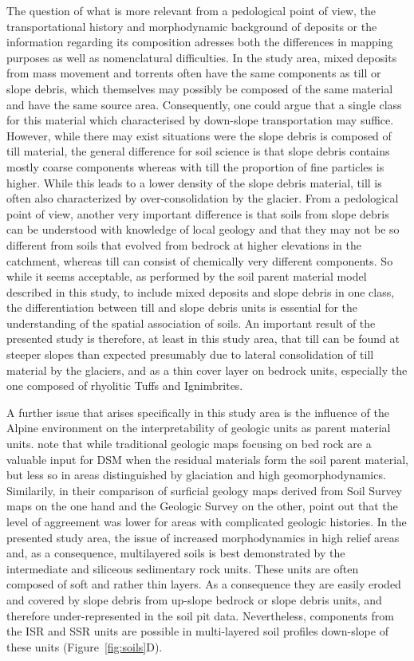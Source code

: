 \documentclass[preprint,12pt,authoryear]{elsarticle}
\begin{document}
The question of what is more relevant from a pedological point of view,  the transportational history and morphodynamic background of deposits  or the information regarding its composition adresses both the differences in mapping purposes as well as nomenclatural difficulties. In the study area, mixed deposits from mass movement and torrents often have the same components as till or slope debris, which themselves may possibly be composed of the same material and have the same source area. Consequently, one could argue that a single class for this material which characterised by down-slope transportation may suffice. However, while there may exist situations were the slope debris is composed of till material, the general difference for soil science is that slope debris contains mostly coarse components whereas with till the proportion of fine particles is higher. While this leads to a lower density of the slope debris material, till is often also characterized by over-consolidation by the glacier. From a pedological point of view, another very important difference is that soils from slope debris can be understood with knowledge of local geology and that they may not be so different from soils  that evolved from bedrock at higher elevations  in the catchment, whereas till can consist of chemically very different components. So while it seems acceptable, as performed by the soil parent material model described in this study, to include mixed deposits and slope debris in one class, the differentiation between till and slope debris units is essential for the understanding of the spatial association of soils. An important result of the presented study is therefore, at least in this study area, that till can be found at steeper slopes than expected presumably due to lateral consolidation of till material by the glaciers, and as a thin cover layer  on bedrock units, especially the one composed of rhyolitic Tuffs and Ignimbrites.

A further issue that arises specifically in this study area is the influence of the Alpine environment on the interpretability of geologic units as parent material units. \cite{Heung2014} note that while traditional geologic maps focusing on bed rock are a valuable input for DSM when the residual materials form the soil parent material, but less so in areas distinguished by glaciation and high geomorphodynamics. Similarily, in their comparison of surficial geology maps derived from Soil Survey maps on the one hand and the Geologic Survey on the other, \cite{Miller2015a} point out that the level of aggreement was lower for areas with complicated geologic histories. In the presented study area, the  issue of increased morphodynamics in high relief areas and, as a consequence, multilayered soils is best demonstrated by the intermediate and siliceous sedimentary rock units. These units are often composed of soft and rather thin layers. As a consequence they are easily eroded and covered by slope debris from up-slope bedrock or slope debris units, and therefore under-represented in the soil pit data. Nevertheless, components from the ISR and SSR units are possible in multi-layered soil profiles down-slope of these units (Figure~\ref{fig:soils}D).
\end{document}
